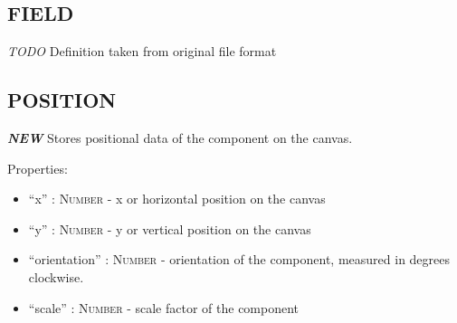 \subsection{FIELD}\label{field}

\emph{TODO}
Definition taken from original file format

\subsection{POSITION}\label{position}

\textbf{\emph{NEW}} Stores positional data of the component on the
canvas.

Properties:

\begin{itemize}
\itemsep1pt\parskip0pt
\item
  ``x'' : \textsc{Number} - x or horizontal position on the canvas
\item
  ``y'' : \textsc{Number} - y or vertical position on the canvas
\item
  ``orientation'' : \textsc{Number} - orientation of the component,
  measured in degrees clockwise.
\item
  ``scale'' : \textsc{Number} - scale factor of the component
\end{itemize}
